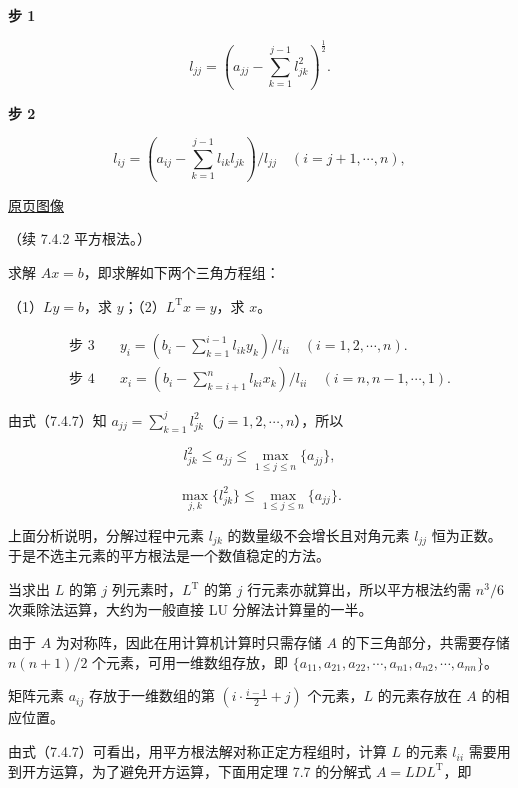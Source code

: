 \documentclass[
  10pt,
  fontset=fandol]{ctexart}
\begin{document}
\textbf{步 1}

\[l_{jj}=\left(a_{jj}-\sum_{k=1}^{j-1}l_{jk}^2\right)^{\frac12}.\tag{7.4.7}\]

\textbf{步 2}

\[l_{ij}=\left(a_{ij}-\sum_{k=1}^{j-1}l_{ik}l_{jk}\right)/l_{jj}\quad(i=j+1,\cdots,n),\]

\href{../../source-images/pdf-196.jpeg}{原页图像}

（续 7.4.2 平方根法。）

求解 \(Ax=b\)，即求解如下两个三角方程组：

（1）\(Ly=b\)，求 \(y\)；（2）\(L^{\mathrm T}x=y\)，求 \(x\)。

\[
\begin{aligned}
\text{步 3}\quad &y_i=\left(b_i-\sum_{k=1}^{i-1}l_{ik}y_k\right)/l_{ii}\quad(i=1,2,\cdots,n).\\
\text{步 4}\quad &x_i=\left(b_i-\sum_{k=i+1}^{n}l_{ki}x_k\right)/l_{ii}\quad(i=n,n-1,\cdots,1).
\end{aligned}
\tag{7.4.8}
\]

由式（7.4.7）知 \(a_{jj}=\sum_{k=1}^{j}l_{jk}^{2}\)（\(j=1,2,\cdots,n\)），所以

\[
l_{jk}^{2}\leqslant a_{jj}\leqslant\max_{1\leqslant j\leqslant n}\{a_{jj}\},
\]

\[
\max_{j,k}\{l_{jk}^{2}\}\leqslant\max_{1\leqslant j\leqslant n}\{a_{jj}\}.
\]

上面分析说明，分解过程中元素 \(l_{jk}\) 的数量级不会增长且对角元素 \(l_{jj}\) 恒为正数。于是不选主元素的平方根法是一个数值稳定的方法。

当求出 \(L\) 的第 \(j\) 列元素时，\(L^{\mathrm T}\) 的第 \(j\) 行元素亦就算出，所以平方根法约需 \(n^3/6\) 次乘除法运算，大约为一般直接 LU 分解法计算量的一半。

由于 \(A\) 为对称阵，因此在用计算机计算时只需存储 \(A\) 的下三角部分，共需要存储 \(n(n+1)/2\) 个元素，可用一维数组存放，即 \(\{a_{11},\allowbreak a_{21},\allowbreak a_{22},\allowbreak \cdots,\allowbreak a_{n1},\allowbreak a_{n2},\allowbreak \cdots,\allowbreak a_{nn}\}\)。

矩阵元素 \(a_{ij}\) 存放于一维数组的第 \(\left(i\cdot\frac{i-1}{2}+j\right)\) 个元素，\(L\) 的元素存放在 \(A\) 的相应位置。

由式（7.4.7）可看出，用平方根法解对称正定方程组时，计算 \(L\) 的元素 \(l_{ii}\) 需要用到开方运算，为了避免开方运算，下面用定理 7.7 的分解式 \(A=LDL^{\mathrm T}\)，即
\end{document}
